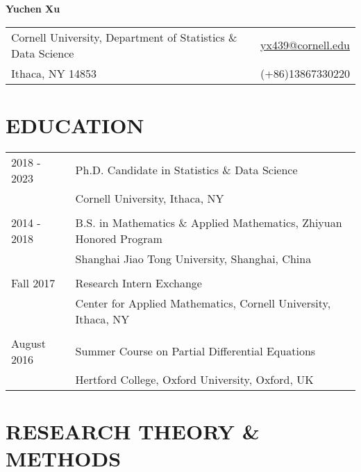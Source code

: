 \documentclass[pdftex,11pt]{article}	%
\newif\ifacademia
\newif\ifus
\begin{document}
 \thispagestyle{empty} %

\begin{center} \huge{\textbf{Yuchen Xu}}\\
\normalsize \end{center}

\indent \begin{tabularx}{\textwidth}{@{} X  r  @{}} 
Cornell University, Department of Statistics \& Data Science & \mbox{\href{mailto:yx439@cornell.edu}{yx439@cornell.edu}} \\
Ithaca, NY 14853 & \ifus(+1)6072621106\else(+86)13867330220\fi \\
\end{tabularx}

\section*{EDUCATION} 
\begin{tabularx}{\textwidth}{ @{} p{2.7cm}  X  @{}}  
	2018 - 2023 & Ph.D. Candidate in Statistics \& Data Science\\ %
	& Cornell University, Ithaca, NY  \\
	& \\
	2014 - 2018 & B.S. in Mathematics \& Applied Mathematics, Zhiyuan Honored Program \\ 
	& Shanghai Jiao Tong University, Shanghai, China  \\
	& \\
	Fall 2017 & Research Intern Exchange \\
	& Center for Applied Mathematics, Cornell University, Ithaca, NY \\
	& \\
	August 2016 & Summer Course on Partial Differential Equations \\
	& Hertford College, Oxford University, Oxford, UK \\
\end{tabularx} 

\ifacademia
\section*{RESEARCH THEORY \& METHODS}
\end{document}
